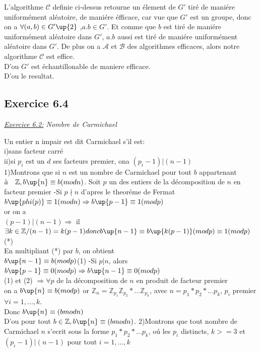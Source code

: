 \documentclass[10pt]{beamer}
\begin{document}
\begin{frame}

L'algorithme $\mathcal{C}$ definie ci-dessus retourne un \'{e}lement de $G'$ tir\'{e} de mani\'{e}re uniform\'{e}ment al\'{e}atoire, de mani\'{e}re \'{e}fficace, car vue que $G'$ est un groupe, donc on a $\forall (a, b) \in G'\up{2}$ ,$a.b \in G'$.
Et comme que $b$ est tir\'{e} de mani\'{e}re uniform\'{e}ment al\'{e}atoire dans $G'$, $a.b$ aussi est tir\'{e} de mani\'{e}re uniform\'{e}ment al\'{e}atoire dans $G'$. De plus on a $\mathcal{A}$ et $\mathcal{B}$ des algorithmes efficaces, alors notre algorithme $\mathcal{C}$ est effice.
\\D'ou $G'$ est \'{e}chantillonable de maniere efficace.
\\D'ou le resultat.

\end{frame}


\begin{frame}

\section{Exercice 6.4}

\emph{\underline{Exercice 6.2:} Nombre de Carmichael}

Un entier n impair est dit Carmichael s'il est:
\\i)sans facteur carr\'{e}
\\ii)si $p_{i}$ est un $d$ ses facteurs premier, ona $(p_{i}-1)|(n-1)$ 
\\1)Montrons que si $n$ est un nombre de Carmichael pour tout $b$ appartenant $\grave{a} \quad \mathbb{Z}, b\up{n} \equiv b (mod n)$.
Soit $p$ un des entiers de la d\'{e}composition de $n$ en facteur premier
-Si $p \nmid n$ d'apres le theor\'{e}me de Fermat $b\up{phi(p)} \equiv 1 (mod n) \Rightarrow b\up{p-1} \equiv 1 (mod p)$ 
\\or on a 
\\$(p-1)|(n-1) \Rightarrow$ il $\exists k \in \mathbb{Z} / (n-1) = k(p-1) donc b\up{n-1} \equiv b\up{k(p-1)} (mod p) \equiv 1 (mod p)$ (*)
\\En multipliant (*) par $b$, on obtient
\\$b\up{n-1} \equiv b (mod p)$(1)
-Si $p|n$, alors $b\up{p-1} \equiv 0 (mod p) \Rightarrow b\up{n-1} \equiv 0 (mod p)$
\\(1) et (2) $\Rightarrow \forall p$ de la d\'{e}composition de $n$ en produit de facteur premier 
\\on a $b\up{n} \equiv b (mod p)$ or $\mathbb{Z}_{n} =\mathbb{Z}_{p_1}\mathbb{Z}_{p_2}* ...\mathbb{Z}_{p_{k}}$, avec $n = p_{1}*p_{2}*...p_{k}$, $p_{i}$ premier $\forall i=1,...,k$.
\\Donc $b\up{n} \equiv (b mod n)$
\\D'ou pour tout $b \in \mathbb{Z}, b\up{n} \equiv (b mod n)$.
2)Montrons que tout nombre de Carmichael $n$ s'ecrit sous la forme  $p_{1}*p_{2}*...p_{k}$, o\'{u} les $p_{i}$ distincts, $k>=3$ et $(p_{i}-1)|(n-1)$ pour tout $i=1,...,k$



\end{frame}
\end{document}
